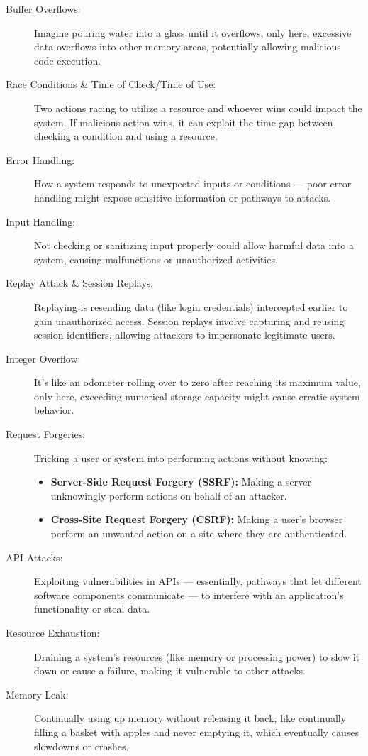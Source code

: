 \begin{fullwidth}
\begin{description}
        \item[Buffer Overflows:] Imagine pouring water into a glass until it overflows, only here, excessive data overflows into other memory areas, potentially allowing malicious code execution. 
        \item[Race Conditions \& Time of Check/Time of Use:] Two actions racing to utilize a resource and whoever wins could impact the system. If malicious action wins, it can exploit the time gap between checking a condition and using a resource.
        \item[Error Handling:] How a system responds to unexpected inputs or conditions — poor error handling might expose sensitive information or pathways to attacks.
        \item[Input Handling:] Not checking or sanitizing input properly could allow harmful data into a system, causing malfunctions or unauthorized activities.
        \item[Replay Attack \& Session Replays:] Replaying is resending data (like login credentials) intercepted earlier to gain unauthorized access. Session replays involve capturing and reusing session identifiers, allowing attackers to impersonate legitimate users.
        \item[Integer Overflow:] It’s like an odometer rolling over to zero after reaching its maximum value, only here, exceeding numerical storage capacity might cause erratic system behavior.
        \item[Request Forgeries:] Tricking a user or system into performing actions without knowing:
        \begin{itemize}
            \item \textbf{Server-Side Request Forgery (SSRF):} Making a server unknowingly perform actions on behalf of an attacker.
            \item \textbf{Cross-Site Request Forgery (CSRF):} Making a user’s browser perform an unwanted action on a site where they are authenticated.
        \end{itemize}
        \item[API Attacks:] Exploiting vulnerabilities in APIs — essentially, pathways that let different software components communicate — to interfere with an application’s functionality or steal data.
        \item[Resource Exhaustion:] Draining a system’s resources (like memory or processing power) to slow it down or cause a failure, making it vulnerable to other attacks.
        \item[Memory Leak:] Continually using up memory without releasing it back, like continually filling a basket with apples and never emptying it, which eventually causes slowdowns or crashes.

\end{description}
\end{fullwidth}
